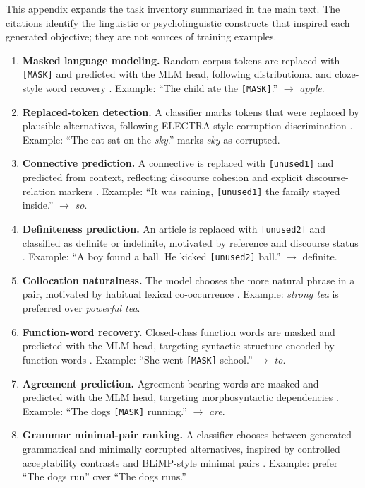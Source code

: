 \documentclass[11pt]{article}
\begin{document}
This appendix expands the task inventory summarized in the main text.
The citations identify the linguistic or psycholinguistic constructs that inspired each generated objective; they are not sources of training examples.
\begin{enumerate}
  \item \textbf{Masked language modeling.} Random corpus tokens are replaced with \texttt{[MASK]} and predicted with the MLM head, following distributional and cloze-style word recovery \citep{harris1954distributional,taylor1953cloze,devlin2019bert}. Example: ``The child ate the \texttt{[MASK]}.'' $\rightarrow$ \textit{apple}.
  \item \textbf{Replaced-token detection.} A classifier marks tokens that were replaced by plausible alternatives, following ELECTRA-style corruption discrimination \citep{clark2020electra}. Example: ``The cat sat on the \textit{sky}.'' marks \textit{sky} as corrupted.
  \item \textbf{Connective prediction.} A connective is replaced with \texttt{[unused1]} and predicted from context, reflecting discourse cohesion and explicit discourse-relation markers \citep{halliday1976cohesion,prasad2008pdtb}. Example: ``It was raining, \texttt{[unused1]} the family stayed inside.'' $\rightarrow$ \textit{so}.
  \item \textbf{Definiteness prediction.} An article is replaced with \texttt{[unused2]} and classified as definite or indefinite, motivated by reference and discourse status \citep{gundel1993cognitive}. Example: ``A boy found a ball. He kicked \texttt{[unused2]} ball.'' $\rightarrow$ definite.
  \item \textbf{Collocation naturalness.} The model chooses the more natural phrase in a pair, motivated by habitual lexical co-occurrence \citep{firth1957synopsis}. Example: \textit{strong tea} is preferred over \textit{powerful tea}.
  \item \textbf{Function-word recovery.} Closed-class function words are masked and predicted with the MLM head, targeting syntactic structure encoded by function words \citep{fries1952structure}. Example: ``She went \texttt{[MASK]} school.'' $\rightarrow$ \textit{to}.
  \item \textbf{Agreement prediction.} Agreement-bearing words are masked and predicted with the MLM head, targeting morphosyntactic dependencies \citep{corbett2006agreement}. Example: ``The dogs \texttt{[MASK]} running.'' $\rightarrow$ \textit{are}.
  \item \textbf{Grammar minimal-pair ranking.} A classifier chooses between generated grammatical and minimally corrupted alternatives, inspired by controlled acceptability contrasts and BLiMP-style minimal pairs \citep{chomsky1957syntactic,warstadt2020blimp}. Example: prefer ``The dogs run'' over ``The dogs runs.''

\end{enumerate}
\end{document}
